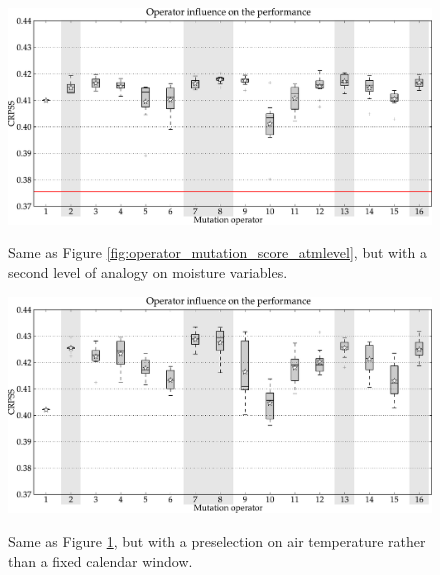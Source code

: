 \documentclass{ametsoc}
\begin{document}
\begin{figure}[t]
	\begin{center}
		\noindent\includegraphics[width=14cm,angle=0]{figures/operator_mutation_score_r2.pdf}\\
	\end{center}
	\caption{Same as Figure \ref{fig:operator_mutation_score_atmlevel}, but with a second level of analogy on moisture variables.}
	\label{fig:operator_mutation_score_r2}
\end{figure}

\begin{figure}[t]
	\begin{center}
		\noindent\includegraphics[width=14cm,angle=0]{figures/operator_mutation_score_r4.pdf}\\
	\end{center}
	\caption{Same as Figure \ref{fig:operator_mutation_score_r2}, but with a preselection on air temperature rather than a fixed calendar window.}
	\label{fig:operator_mutation_score_r4}
\end{figure}
\end{document}
